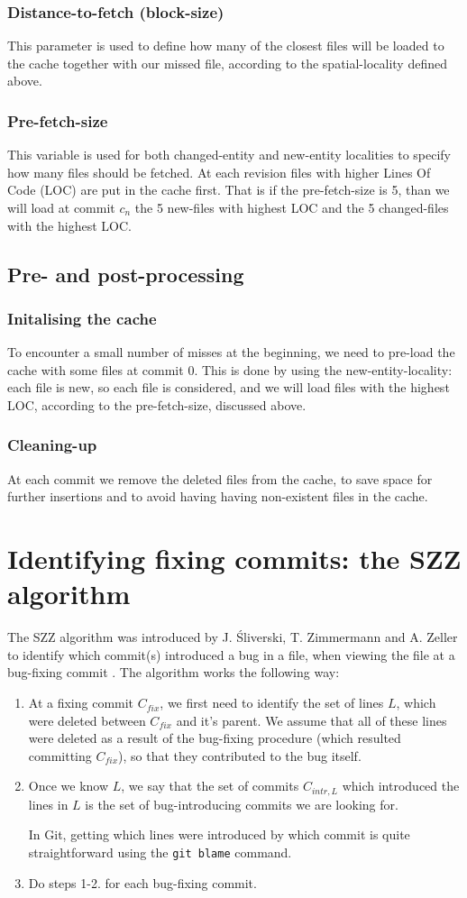 \documentclass[12pt,twoside,notitlepage]{report}
\begin{document}
\subsubsection{Distance-to-fetch (block-size)}
This parameter is used to define how many of the closest files will be loaded to the cache together with our missed file, according to the spatial-locality defined above.

\subsubsection{Pre-fetch-size}
This variable is used for both changed-entity and new-entity localities to specify how many files should be fetched. At each revision files with higher Lines Of Code (LOC) are put in the cache first. That is if the pre-fetch-size is 5, than we will load at commit $c_n$ the 5 new-files with highest LOC and the 5 changed-files with the highest LOC.
\subsection{Pre- and post-processing}
\subsubsection{Initalising the cache}
To encounter a small number of misses at the beginning, we need to pre-load the cache with some files at commit $0$. This is done by using the new-entity-locality: each file is new, so each file is considered, and we will load files with the highest LOC, according to the pre-fetch-size, discussed above.
\subsubsection{Cleaning-up}
At each commit we remove the deleted files from the cache, to save space for further insertions and to avoid having having non-existent files in the cache.
\section{Identifying fixing commits: the SZZ algorithm}\label{szz}
The SZZ algorithm was introduced by J. \'Sliverski, T. Zimmermann and A. Zeller to identify which commit(s) introduced a bug in a file, when viewing the file at a bug-fixing commit \cite{SZZ}. The algorithm works the following way:
\begin{enumerate}
\item At a fixing commit $C_{fix}$, we first need to identify the set of lines $L$, which were deleted between $C_{fix}$ and it's parent. We assume that all of these lines were deleted as a result of the bug-fixing procedure (which resulted committing $C_{fix}$), so that they contributed to the bug itself.
\item Once we know $L$, we say that the set of commits $C_{intr,L}$ which introduced the lines in $L$ is the set of bug-introducing commits we are looking for.

In Git, getting which lines were introduced by which commit is quite straightforward using the \texttt{git blame} command.
\item Do steps 1-2. for each bug-fixing commit.
\end{enumerate}
\end{document}
